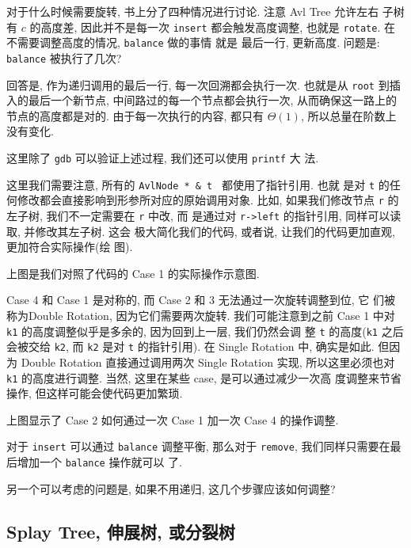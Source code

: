 \documentclass[a4paper]{ctexart}
\theoremstyle{definition}
\theoremstyle{definition}
\begin{document}
对于什么时候需要旋转, 书上分了四种情况进行讨论. 注意 Avl Tree 允许左右
子树有 $c$ 的高度差, 因此并不是每一次 \verb|insert| 都会触发高度调整,
也就是 \verb|rotate|. 在不需要调整高度的情况, \verb|balance| 做的事情
就是 最后一行, 更新高度. 问题是: \verb|balance| 被执行了几次?

回答是, 作为递归调用的最后一行, 每一次回溯都会执行一次. 也就是从
\verb|root| 到插入的最后一个新节点, 中间路过的每一个节点都会执行一次,
从而确保这一路上的节点的高度都是对的. 由于每一次执行的内容, 都只有
$\Theta(1)$, 所以总量在阶数上没有变化.

这里除了 \verb|gdb| 可以验证上述过程, 我们还可以使用 \verb|printf| 大
法.

这里我们需要注意, 所有的 \verb|AvlNode * & t | 都使用了指针引用. 也就
是对 \verb|t| 的任何修改都会直接影响到形参所对应的原始调用对象. 比如,
如果我们修改节点 \verb|r| 的左子树, 我们不一定需要在 \verb|r| 中改, 而
是通过对 \verb|r->left| 的指针引用, 同样可以读取, 并修改其左子树. 这会
极大简化我们的代码, 或者说, 让我们的代码更加直观, 更加符合实际操作(绘
图).


上图是我们对照了代码的 Case 1 的实际操作示意图.

Case 4 和 Case 1 是对称的, 而 Case 2 和 3 无法通过一次旋转调整到位, 它
们被称为Double Rotation, 因为它们需要两次旋转. 我们可能注意到之前 Case
1 中对 \verb|k1| 的高度调整似乎是多余的, 因为回到上一层, 我们仍然会调
整 \verb|t| 的高度(\verb|k1| 之后会被交给 \verb|k2|, 而 \verb|k2| 是对
\verb|t| 的指针引用). 在 Single Rotation 中, 确实是如此. 但因为 Double
Rotation 直接通过调用两次 Single Rotation 实现, 所以这里必须也对
\verb|k1| 的高度进行调整. 当然, 这里在某些 case, 是可以通过减少一次高
度调整来节省操作, 但这样可能会使代码更加繁琐.


上图显示了 Case 2 如何通过一次 Case 1 加一次 Case 4 的操作调整.

对于 \verb|insert| 可以通过 \verb|balance| 调整平衡, 那么对于
\verb|remove|, 我们同样只需要在最后增加一个 \verb|balance| 操作就可以
了. 

另一个可以考虑的问题是, 如果不用递归, 这几个步骤应该如何调整? 

\subsection{Splay Tree, 伸展树, 或分裂树}
\end{document}

